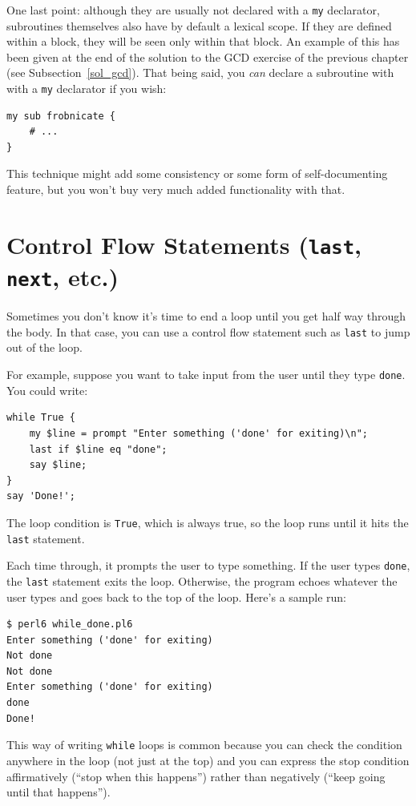 One last point: although they are usually not declared with 
a {\tt my} declarator, subroutines themselves also have by default
a lexical scope. If they are defined within a block, they will 
be seen only within that block. An example of this has been 
given at the end of the solution to the GCD exercise of the 
previous chapter (see Subsection~\ref{sol_gcd}). 
That being said, you \emph{can} declare a subroutine with 
with a {\tt my} declarator if you wish:

\begin{verbatim}
my sub frobnicate { 
    # ... 
}
\end{verbatim}

This technique might add some consistency or some form of 
self-documenting feature, but you won't buy very much 
added functionality with that.
 

\section{Control Flow Statements ({\tt last}, {\tt next}, etc.)}

Sometimes you don't know it's time to end a loop until you get half
way through the body.  In that case, you can use a control flow 
statement such as {\tt last} to jump out of the loop.

For example, suppose you want to take input from the user until they
type {\tt done}.  You could write:

\begin{verbatim}
while True {
    my $line = prompt "Enter something ('done' for exiting)\n";
    last if $line eq "done";
    say $line;
}
say 'Done!';
\end{verbatim}
%
The loop condition is {\tt True}, which is always true, so the
loop runs until it hits the {\tt last} statement.

Each time through, it prompts the user to type something.
If the user types {\tt done}, the {\tt last} statement exits
the loop.  Otherwise, the program echoes whatever the user types
and goes back to the top of the loop.  Here's a sample run:

\begin{verbatim}
$ perl6 while_done.pl6
Enter something ('done' for exiting)
Not done
Not done
Enter something ('done' for exiting)
done
Done!
\end{verbatim}
%
This way of writing {\tt while} loops is common because you
can check the condition anywhere in the loop (not just at the
top) and you can express the stop condition affirmatively
(``stop when this happens'') rather than negatively (``keep 
going until that happens'').

